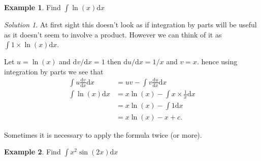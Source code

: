 \documentclass[
  english,
  11pt,
  oneside]{book}
\newcommand{\slide}{}
\theoremstyle{definition}
\theoremstyle{definition}
\newtheorem{example}{Example}[chapter]
\theoremstyle{definition}
\theoremstyle{definition}
\theoremstyle{remark}
\newtheorem*{solution}{Solution}
\begin{document}
\slide

\begin{example}
Find \(\displaystyle\int \ln(x)\mathrm{d}x\)
\end{example}

\begin{solution}
At first sight this doesn't look as if integration by parts will be useful as it doesn't seem to involve a product. However we can think of it as \(\displaystyle\int 1\times\ln(x)\mathrm{d}x\).

Let \(u = \ln(x)\) and \(\mathrm{d}v/\mathrm{d}x = 1\) then \(\mathrm{d}u/\mathrm{d}x = 1/x\) and \(v = x\). hence using integration by parts we see that
\begin{align*}
\int u\frac{\mathrm{d}v}{\mathrm{d}x}\mathrm{d}x& = uv-\int v\frac{\mathrm{d}u}{\mathrm{d}x}\mathrm{d}x\\
\int\ln(x)\mathrm{d}x&=x\ln(x)-\int x\times\frac 1x \mathrm{d}x\\
&=x\ln(x)-\int 1\mathrm{d}x\\
&=x\ln(x)-x + c.
\end{align*}
\end{solution}

\slide

Sometimes it is necessary to apply the formula twice (or more).

\begin{example}
Find \(\displaystyle\int x^2\sin(2x)\mathrm{d}x\)
\end{example}
\end{document}
